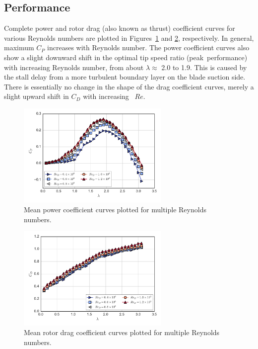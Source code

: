 \documentclass[energies,article,accept,moreauthors,pdftex,10pt,a4paper]{mdpi}
\theoremstyle{mdpi}
\newcounter{ex}
\newcounter{re}
\begin{document}
\subsection{Performance}

Complete power and rotor drag (also known as thrust) coefficient curves for
various Reynolds numbers are plotted in Figures~\ref{fig:cp-curves} and
\ref{fig:cd-curves}, respectively. In general, maximum $C_P$ increases with
Reynolds number. The power coefficient curves also show a slight downward shift
in the optimal tip speed ratio (peak~performance) with increasing Reynolds
number, from about $\lambda \approx$ 2.0 to 1.9. This is caused by the stall
delay from a more turbulent boundary layer on the blade suction side. There is
essentially no change in the shape of the drag coefficient curves, merely a
slight upward shift in $C_D$ with increasing~ $Re$.

\begin{figure}[H]
    \centering
    
    \includegraphics[width=0.65\textwidth]{figures/cp_curves}
    
    \caption{Mean power coefficient curves plotted for multiple Reynolds
        numbers.}
    
    \label{fig:cp-curves}
\end{figure}
\unskip

\begin{figure}[H]
    \centering
    
    \includegraphics[width=0.65\textwidth]{figures/cd_curves}
    
    \caption{Mean rotor drag coefficient curves plotted for multiple Reynolds
        numbers.}
    
    \label{fig:cd-curves}
\end{figure}
\end{document}

